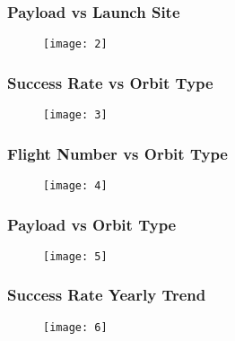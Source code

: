 \documentclass{beamer}
\begin{document}

\begin{frame}

\frametitle{Payload vs Launch Site}

\begin{figure}
\texttt{[image: 2]}
\end{figure}

\end{frame}



\begin{frame}

\frametitle{Success Rate vs Orbit Type}

\begin{figure}
\texttt{[image: 3]}
\end{figure}

\end{frame}


\begin{frame}

\frametitle{Flight Number vs Orbit Type}

\begin{figure}
\texttt{[image: 4]}
\end{figure}

\end{frame}


\begin{frame}

\frametitle{Payload vs Orbit Type}

\begin{figure}
\texttt{[image: 5]}
\end{figure}

\end{frame}


\begin{frame}

\frametitle{Success Rate Yearly Trend}

\begin{figure}
\texttt{[image: 6]}
\end{figure}

\end{frame}

\end{document}
